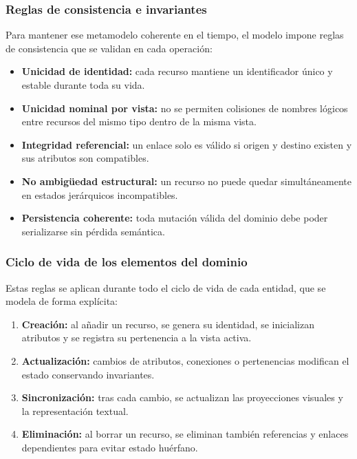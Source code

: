 \documentclass{article}
\begin{document}
{        \subsubsection{Reglas de consistencia e invariantes}
        \justify
        Para mantener ese metamodelo coherente en el tiempo, el modelo impone reglas de
        consistencia que se validan en cada operación:

        \begin{itemize}
            \item \textbf{Unicidad de identidad:} cada recurso mantiene un identificador único
            y estable durante toda su vida.
            \item \textbf{Unicidad nominal por vista:} no se permiten colisiones de nombres
            lógicos entre recursos del mismo tipo dentro de la misma vista.
            \item \textbf{Integridad referencial:} un enlace solo es válido si origen y
            destino existen y sus atributos son compatibles.
            \item \textbf{No ambigüedad estructural:} un recurso no puede quedar simultáneamente
            en estados jerárquicos incompatibles.
            \item \textbf{Persistencia coherente:} toda mutación válida del dominio debe poder
            serializarse sin pérdida semántica.
        \end{itemize}

        \subsubsection{Ciclo de vida de los elementos del dominio}
        \justify
        Estas reglas se aplican durante todo el ciclo de vida de cada entidad, que se
        modela de forma explícita:

        \begin{enumerate}
            \item \textbf{Creación:} al añadir un recurso, se genera su identidad, se inicializan
            atributos y se registra su pertenencia a la vista activa.
            \item \textbf{Actualización:} cambios de atributos, conexiones o pertenencias
            modifican el estado conservando invariantes.
            \item \textbf{Sincronización:} tras cada cambio, se actualizan las proyecciones
            visuales y la representación textual.
            \item \textbf{Eliminación:} al borrar un recurso, se eliminan también referencias
            y enlaces dependientes para evitar estado huérfano.
        \end{enumerate}

}
\end{document}
